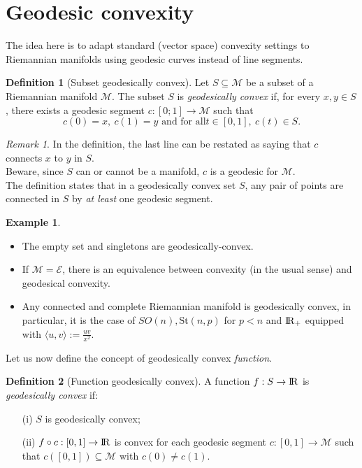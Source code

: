 \documentclass[10pt,a4paper]{book}
\theoremstyle{definition}
\newtheorem{defn}{Definition}[section]
\newtheorem{exm}{Example}[section]
\theoremstyle{plain}
\theoremstyle{remark}
\newtheorem{rmk}{Remark}[section]
\newcommand{\E}{\mathcal{E}}
\newcommand \M {\mathcal{M}}
\def\R{{\rm I\kern-0.16em R}}
\begin{document}
\section{Geodesic convexity}
The idea here is to adapt standard (vector space) convexity settings to Riemannian manifolds using geodesic curves instead of line segments. 
\begin{defn}[Subset geodesically convex]
Let $S\subseteq \M$ be a subset of a Riemannian manifold $\M$. The subset $S$ is \emph{geodesically convex}
 if, for every $x,y \in S$, there exists a geodesic segment $c:[0;1]\to \M$ such that 
$$c(0)=x,~c(1)=y\text{ and for all} t \in [0,1],~c(t) \in S.$$
\end{defn}
\begin{rmk}In the definition, the last line can be restated as saying that $c$ connects $x$ to $y$ in $S$. \\
Beware, since $S$ can or cannot be a manifold, $c$ is a geodesic for $\M$. \\ The definition states that in a geodesically convex set $S$, any pair of points are connected in $S$ by \emph{at least} one geodesic segment. 
\end{rmk}
\begin{exm}~
\begin{itemize}
\item The empty set and singletons are geodesically-convex.
\item If $\M=\E$, there is an equivalence between convexity (in the usual sense) and geodesical convexity.
\item Any connected and complete Riemannian manifold is geodesically convex, in particular, it is the case of $SO(n), \text{St}(n,p)$ for $p<n$ and $\R_{+}$ equipped with $\langle u,v\rangle :=\frac{uv}{x^2}$.
\end{itemize}
\end{exm}
Let us now define the concept of geodesically convex \emph{function}.
\begin{defn}[Function geodesically convex]
A function $f:S\to \R$ is \emph{geodesically convex} if:
\begin{itemize}
\item[(i)] $S$ is geodesically convex;
\item[(ii)] $f\circ c: [0,1]\to \R$ is convex for each geodesic segment $c:[0,1]\to \M$ such that $c([0,1])\subseteq \M$ with $c(0)\neq c(1)$.
\end{itemize}
\end{defn}
\end{document}
